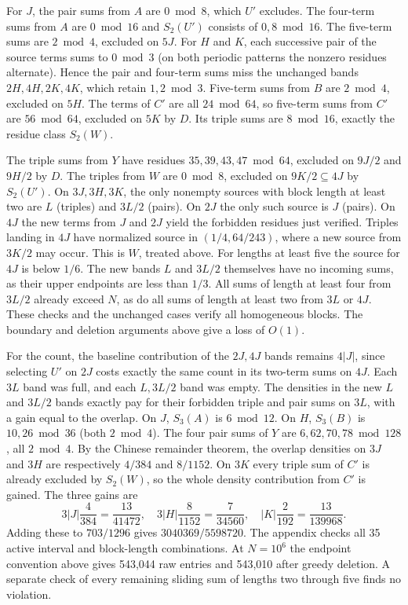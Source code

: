 \documentclass[11pt]{article}
\begin{document}
For $J$, the pair sums from $A$ are $0\bmod8$, which $U'$ excludes. The four-term sums from $A$ are $0\bmod16$ and $S_2(U')$ consists of $0,8\bmod16$. The five-term sums are $2\bmod4$, excluded on $5J$. For $H$ and $K$, each successive pair of the source terms sums to $0\bmod3$ (on both periodic patterns the nonzero residues alternate). Hence the pair and four-term sums miss the unchanged bands $2H,4H,2K,4K$, which retain $1,2\bmod3$. Five-term sums from $B$ are $2\bmod4$, excluded on $5H$. The terms of $C'$ are all $24\bmod64$, so five-term sums from $C'$ are $56\bmod64$, excluded on $5K$ by $D$. Its triple sums are $8\bmod16$, exactly the residue class $S_2(W)$.

The triple sums from $Y$ have residues $35,39,43,47\bmod64$, excluded on $9J/2$ and $9H/2$ by $D$. The triples from $W$ are $0\bmod8$, excluded on $9K/2\subseteq4J$ by $S_2(U')$. On $3J,3H,3K$, the only nonempty sources with block length at least two are $L$ (triples) and $3L/2$ (pairs). On $2J$ the only such source is $J$ (pairs). On $4J$ the new terms from $J$ and $2J$ yield the forbidden residues just verified. Triples landing in $4J$ have normalized source in $(1/4,64/243)$, where a new source from $3K/2$ may occur. This is $W$, treated above. For lengths at least five the source for $4J$ is below $1/6$. The new bands $L$ and $3L/2$ themselves have no incoming sums, as their upper endpoints are less than $1/3$. All sums of length at least four from $3L/2$ already exceed $N$, as do all sums of length at least two from $3L$ or $4J$. These checks and the unchanged cases verify all homogeneous blocks. The boundary and deletion arguments above give a loss of $O(1)$.

For the count, the baseline contribution of the $2J,4J$ bands remains $4|J|$, since selecting $U'$ on $2J$ costs exactly the same count in its two-term sums on $4J$. Each $3L$ band was full, and each $L,3L/2$ band was empty. The densities in the new $L$ and $3L/2$ bands exactly pay for their forbidden triple and pair sums on $3L$, with a gain equal to the overlap. On $J$, $S_3(A)$ is $6\bmod12$. On $H$, $S_3(B)$ is $10,26\bmod36$ (both $2\bmod4$). The four pair sums of $Y$ are $6,62,70,78\bmod128$, all $2\bmod4$. By the Chinese remainder theorem, the overlap densities on $3J$ and $3H$ are respectively $4/384$ and $8/1152$. On $3K$ every triple sum of $C'$ is already excluded by $S_2(W)$, so the whole density contribution from $C'$ is gained. The three gains are
\[
3|J|\frac{4}{384}=\frac{13}{41472},\quad
3|H|\frac{8}{1152}=\frac7{34560},\quad
|K|\frac2{192}=\frac{13}{139968}.
\]
Adding these to $703/1296$ gives $3040369/5598720$. The appendix checks all 35 active interval and block-length combinations. At $N=10^6$ the endpoint convention above gives 543,044 raw entries and 543,010 after greedy deletion. A separate check of every remaining sliding sum of lengths two through five finds no violation.
\end{document}

